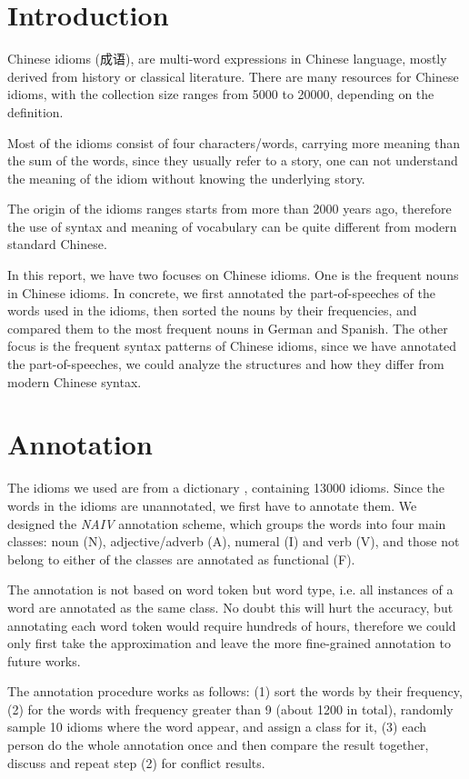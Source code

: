 \section{Introduction}
Chinese idioms (成语), are multi-word expressions in Chinese language, mostly derived from history or classical literature. There are many resources for Chinese idioms, with the collection size ranges from 5000 to 20000, depending on the definition.

Most of the idioms consist of four characters/words, carrying more meaning than the sum of the words, since they usually refer to a story, one can not understand the meaning of the idiom without knowing the underlying story.

The origin of the idioms ranges starts from more than 2000 years ago, therefore the use of syntax and meaning of vocabulary can be quite different from modern standard Chinese. 

In this report, we have two focuses on Chinese idioms.
One is the frequent nouns in Chinese idioms. In concrete, we first annotated the part-of-speeches of the words used in the idioms, then sorted the nouns by their frequencies, and compared them to the most frequent nouns in German and Spanish.
The other focus is the frequent syntax patterns of Chinese idioms, since we have annotated the part-of-speeches, we could analyze the structures and how they differ from modern Chinese syntax.

\section{Annotation}
The idioms we used are from a dictionary \cite{song:2014}, containing 13000 idioms. 
Since the words in the idioms are unannotated, we first have to annotate them. We designed the {\em NAIV} annotation scheme, which  groups the words into four main classes: noun (N), adjective/adverb (A), numeral (I) and verb (V), and those not belong to either of the classes are annotated as functional (F). 

The annotation is not based on word token but word type, i.e. all instances of a word are annotated as the same class. No doubt this will hurt the accuracy, but annotating each word token would require hundreds of hours, therefore we could only first take the approximation and leave the more fine-grained annotation to future works.

The annotation procedure works as follows: (1) sort the words by their frequency, (2) for the words with frequency greater than 9 (about 1200 in total), randomly sample 10 idioms where the word appear, and assign a class for it, (3) each person do the whole annotation once and then compare the result together, discuss and repeat step (2) for conflict results.

